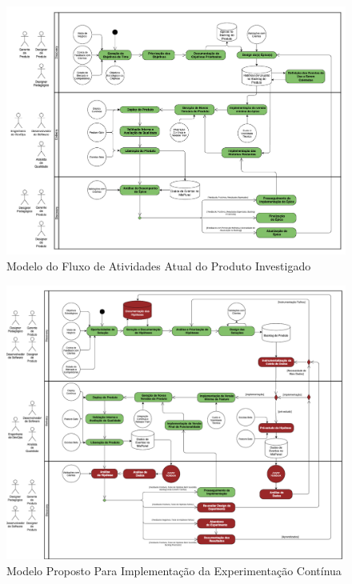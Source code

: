 \begin{figure}
    \centering
    \caption{Modelo do Fluxo de Atividades Atual do Produto Investigado}
    \includegraphics[width=1\linewidth]{figuras/processo-atual.png}
    \begin{center}
    \end{center}
    \label{fig:processo-atual}
\end{figure}

\begin{figure}
    \centering
    \caption{Modelo Proposto Para Implementação da Experimentação Contínua}
    \includegraphics[width=1\linewidth]{figuras/processo-novo.png}
    \begin{center}
    \end{center}
    \label{fig:processo-novo}
\end{figure}


